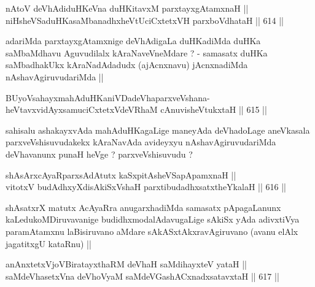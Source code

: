 \begin{shl}
nAtoV deVhAdiduHKeVna duHKitavxM parxtayxgAtamxnaH || \\
niHsheVSaduHKasaMbanadhxheVtUciCxtetxVH parxboVdhataH ||  614 ||  
\end{shl}

\begin{artha}
adariMda parxtayxgAtamxnige deVhAdigaLa duHKadiMda duHKa saMbaMdhavu
Aguvudilalx kAraNaveVneMdare ? - samasatx duHKa saMbadhakUkx
kAraNadAdadudx (ajAcnxnavu) jAcnxnadiMda nAshavAgiruvudariMda ||
\end{artha}


\begin{shl}
BUyoV\s sahayxmahAduHKaniVDadeVhaparxveVshana- \\
heVtavxvidAyxsamuciCxtetxVdeVRhaM cAnuvisheVtukxtaH ||  615 ||  
\end{shl}

\begin{artha}
sahisalu ashakayxvAda mahAduHKagaLige maneyAda deVhadoLage aneVkasala
parxveVshisuvudakekx kAraNavAda avideyxyu nAshavAgiruvudariMda
deVhavanunx punaH heVge ? parxveVshisuvudu ?
\end{artha}


\begin{shl}
shAsArxcAyaRparxsAdAtutx kaSxpitAsheVSapApamxnaH || \\
vitotxV budAdhxyXdisAkiSxVshaH parxtibudadhxsatxtheYkalaH ||  616 ||  
\end{shl}

\begin{artha}
shAsatxrX matutx AcAyaRra anugarxhadiMda samasatx pApagaLanunx
kaLedukoMDiruvavanige budidhxmodalAdavugaLige sAkiSx yAda adivxtiVya
paramAtamxnu laBisiruvano aMdare sAkASxtAkxravAgiruvano (avanu elAlx
jagatitxgU kataRnu) ||
\end{artha} 


\begin{shl}
anAnxtetxVjoVBiratayxthaRM deVhaH saMdihayxteV yataH || \\
saMdeVhasetxVna deVhoV\s yaM saMdeVGashACxnadxsatavxtaH ||  617 ||  
\end{shl}

